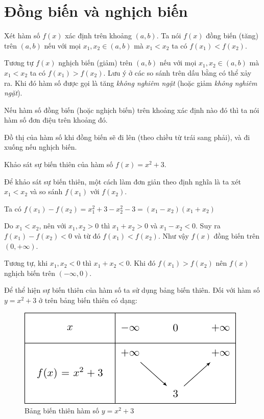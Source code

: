 \section{Đồng biến và nghịch biến}

\begin{definition}
    Xét hàm số $f(x)$ xác định trên khoảng $(a, b)$. Ta nói $f(x)$ đồng biến (tăng) trên $(a, b)$ 
    nếu với mọi $x_1, x_2 \in (a, b)$ mà $x_1 < x_2$ ta có $f(x_1) < f(x_2)$.
\end{definition}

Tương tự $f(x)$ nghịch biến (giảm) trên $(a, b)$ nếu với mọi $x_1, x_2 \in (a, b)$ mà 
$x_1 < x_2$ ta có $f(x_1) > f(x_2)$.
Lưu ý ở các so sánh trên dấu bằng có thể xảy ra. Khi đó hàm số
được gọi là tăng \textit{không nghiêm ngặt} (hoặc giảm \textit{không
nghiêm ngặt}).

Nếu hàm số đồng biến (hoặc nghịch biến) trên khoảng xác định nào đó thì ta
nói hàm số đơn điệu trên khoảng đó.

Đồ thị của hàm số khi đồng biến sẽ đi lên (theo chiều từ trái sang phải), và đi
xuống nếu nghịch biến.

\begin{example}
    Khảo sát sự biến thiên của hàm số $f(x) = x^2 + 3$.

    Để khảo sát sự biến thiên, một cách làm đơn giản theo định nghĩa
    là ta xét $x_1 < x_2$ và so sánh $f(x_1)$ với $f(x_2)$.

    Ta có $f(x_1) - f(x_2) = x_1^2 + 3 - x_2^2 - 3 = (x_1 - x_2)(x_1 + x_2)$

    Do $x_1 < x_2$, nên với $x_1, x_2 > 0$ thì $x_1 + x_2 > 0$ và
    $x_1 - x_2 < 0$. Suy ra $f(x_1) - f(x_2) < 0$ và từ đó $f(x_1) < f(x_2)$. Như
    vậy $f(x)$ đồng biến trên $(0, +\infty)$.

    Tương tự, khi $x_1, x_2 < 0$ thì $x_1 + x_2 < 0$. Khi đó $f(x_1) > f(x_2)$
    nên $f(x)$ nghịch biến trên $(-\infty, 0)$.
\end{example}

Để thể hiện sự biến thiên của hàm số ta sử dụng bảng biến thiên.
Đối với hàm số $y = x^2 + 3$ ở trên bảng biến thiên có dạng:

\begin{figure}[bh]
    \centering
    \includegraphics{../pics/algebra/algebra1.pdf}
    \caption{Bảng biến thiên hàm số $y=x^2 + 3$}
\end{figure}

